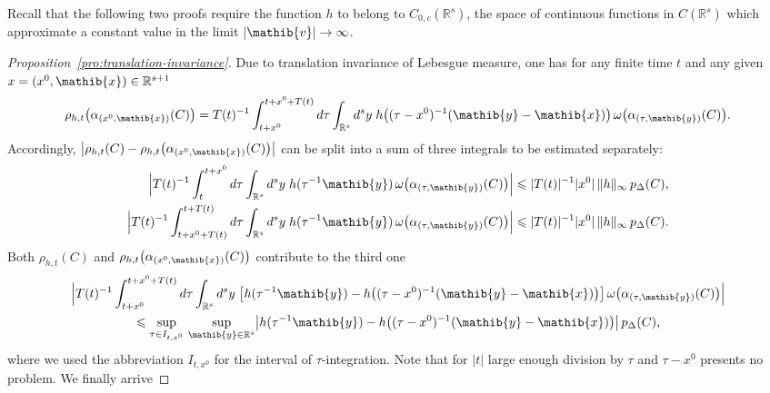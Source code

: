 \documentclass[a4paper,a4paper]{article}
\numberwithin{equation}{section}
\newcommand{\vib}{\mathib{v}}
\newcommand{\xib}{\mathib{x}}
\newcommand{\yib}{\mathib{y}}
\newcommand{\Rs}{\mathbb{R}^s}
\newcommand{\Rsone}{\mathbb{R}^{s + 1}}
\theoremstyle{definition}
\theoremstyle{plain}
\theoremstyle{remark}
\newcommand{\abs}[1]{\lvert #1 \rvert}
\newcommand{\babs}[1]{\bigl\lvert #1 \bigr\rvert}
\newcommand{\Babs}[1]{\Bigl\lvert #1 \Bigr\rvert}
\newcommand{\norm}[1]{\lVert #1 \rVert}
\newcommand{\pDx}[1]{p_\Delta ( #1 )}
\begin{document}
  Recall that the following two proofs require the function $h$ to
  belong to $C_{0 , c} ( \Rs )$, the space of continuous functions in
  $C ( \Rs )$ which approximate a constant value in the limit
  $\abs{\vib} \rightarrow \infty$.
  \begin{proof}[Proposition~\ref{pro:translation-invariance}]
    Due to translation invariance of Lebesgue measure, one has for any
    finite time $t$ and any given $x = ( x^0 , \xib ) \in \Rsone$
    \begin{equation*}
      \rho_{h , t} \bigl( \alpha_{( x^0 , \xib )} ( C ) \bigr) = T ( t
      )^{-1} \int_{t + x^0}^{t + x^0 + T ( t )} d \tau \int_{\Rs} d^s
      y \; h \bigl( ( \tau - x^0 )^{-1} ( \yib - \xib ) \bigr) \,
      \omega \bigl( \alpha_{( \tau , \yib )} ( C ) \bigr) \text{.}
    \end{equation*}
    Accordingly, $\babs{\rho_{h , t} ( C ) - \rho_{h , t} \bigl(
    \alpha_{( x^0 , \xib )} ( C ) \bigr)}$ can be split into a sum of
    three integrals to be estimated separately:
    \begin{align*}
      \Babs{T ( t )^{-1} \int_t^{t + x^0} d \tau \int_{\Rs} d^s y \; h
      ( \tau^{-1} \yib ) \, \omega \bigl( \alpha_{( \tau , \yib )} ( C
      ) \bigr)} & \leqslant \abs{T ( t )}^{-1} \abs{x^0} \,
      \norm{h}_\infty \, \pDx{C} \text{,} \\
      \Babs{T ( t )^{-1} \int_{t + x^0 + T ( t )}^{t + T ( t )} d \tau
      \int_{\Rs} d^s y \; h ( \tau^{-1} \yib ) \, \omega \bigl(
      \alpha_{( \tau , \yib )} ( C ) \bigr)} & \leqslant \abs{T ( t
      )}^{-1} \abs{x^0} \, \norm{h}_\infty \, \pDx{C} \text{.}
    \end{align*}
    Both $\rho_{h , t} ( C )$ and $\rho_{h , t} \bigl( \alpha_{( x^0 ,
    \xib )} ( C ) \bigr)$ contribute to the third one
    \begin{multline*}
      \Babs{T ( t )^{-1} \int_{t + x^0}^{t + x^0 + T ( t )} d \tau
      \int_{\Rs} d^s y \; \bigl[ h ( \tau^{-1} \yib ) - h \bigl( (
      \tau - x^0 )^{-1} ( \yib - \xib ) \bigr) \bigr] \, \omega \bigl(
      \alpha_{( \tau , \yib )} ( C ) \bigr)} \\
      \leqslant \sup_{\tau \in I_{t , x^0}} \, \sup_{\yib \in \Rs}
      \babs{h ( \tau^{-1} \yib ) - h \bigl( ( \tau - x^0 )^{-1} ( \yib
      - \xib ) \bigr)} \, \pDx{C} \text{,}
    \end{multline*}
    where we used the abbreviation $I_{t , x^0}$ for the interval of
    $\tau$-integration. Note that for $\abs{t}$ large enough division
    by $\tau$ and $\tau - x^0$ presents no problem. We finally arrive

\end{proof}
\end{document}
